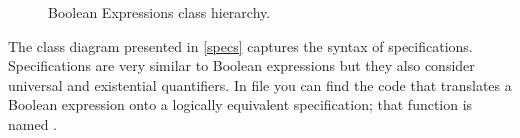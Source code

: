 \documentclass[11pt]{article}
\begin{document}
\begin{figure}
\caption{Boolean Expressions class hierarchy.}
\label{bools}
\end{figure}

The class diagram presented in \cref{specs} captures the syntax of specifications. Specifications are very similar to Boolean expressions but they also consider universal and existential quantifiers. In file  you can find the code that translates a Boolean expression onto a logically equivalent specification; that function is named .
\end{document}
